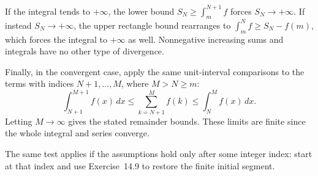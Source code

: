 If the integral tends to $+\infty$, the lower bound
$S_N\ge\int_m^{N+1}f$ forces $S_N\to+\infty$.
If instead $S_N\to+\infty$, the upper rectangle bound rearranges
to $\int_m^N f\ge S_N-f(m)$, which forces the integral to
$+\infty$ as well. Nonnegative increasing sums and integrals have
no other type of divergence.

Finally, in the convergent case, apply the same unit-interval
comparisons to the terms with indices $N+1,\ldots,M$, where
$M>N\ge m$:
\[
 \int_{N+1}^{M+1}f(x)\,dx
 \le\sum_{k=N+1}^{M}f(k)
 \le\int_N^M f(x)\,dx.
\]
Letting $M\to\infty$ gives the stated remainder bounds. These
limits are finite since the whole integral and series converge.

The same test applies if the assumptions hold only after some
integer index: start at that index and use Exercise~14.9 to restore
the finite initial segment.
